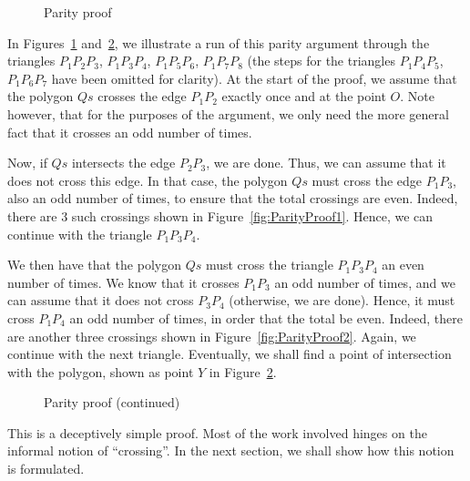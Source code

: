 \begin{figure}
\caption{Parity proof}
\label{fig:ParityProof}
\end{figure}

In Figures~\ref{fig:ParityProof} and~\ref{fig:ParityProofCont}, we illustrate a run of this parity argument through the triangles $P_1P_2P_3$, $P_1P_3P_4$, $P_1P_5P_6$, $P_1P_7P_8$ (the steps for the triangles $P_1P_4P_5$, $P_1P_6P_7$ have been omitted for clarity). At the start of the proof, we assume that the polygon $Qs$ crosses the edge $P_1P_2$ exactly once and at the point $O$. Note however, that for the purposes of the argument, we only need the more general fact that it crosses an odd number of times. 

Now, if $Qs$ intersects the edge $P_2P_3$, we are done. Thus, we can assume that it does not cross this edge. In that case, the polygon $Qs$ must cross the edge $P_1P_3$, also an odd number of times, to ensure that the total crossings are even. Indeed, there are 3 such crossings shown in Figure~\ref{fig:ParityProof1}. Hence, we can continue with the triangle $P_1P_3P_4$. 

We then have that the polygon $Qs$ must cross the triangle $P_1P_3P_4$ an even number of times. We know that it crosses $P_1P_3$ an odd number of times, and we can assume that it does not cross $P_3P_4$ (otherwise, we are done). Hence, it must cross $P_1P_4$ an odd number of times, in order that the total be even. Indeed, there are another three crossings shown in Figure~\ref{fig:ParityProof2}. Again, we continue with the next triangle. Eventually, we shall find a point of intersection with the polygon, shown as point $Y$ in Figure~\ref{fig:ParityProofCont}.

\begin{figure}
\caption{Parity proof (continued)}
\label{fig:ParityProofCont}
\end{figure}

This is a deceptively simple proof. Most of the work involved hinges on the informal notion of ``crossing''. In the next section, we shall show how this notion is formulated.

